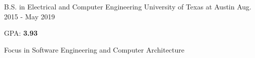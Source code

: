 

\begin{cventries}

  \cventry
    {B.S. in Electrical and Computer Engineering} %
    {University of Texas at Austin} %
    {} %
    {Aug. 2015 - May 2019} %
    {
      \begin{cvitems} %
        \item {GPA: \textbf{3.93}}
        \item {Focus in Software Engineering and Computer Architecture}
      \end{cvitems}
    }

\end{cventries}
